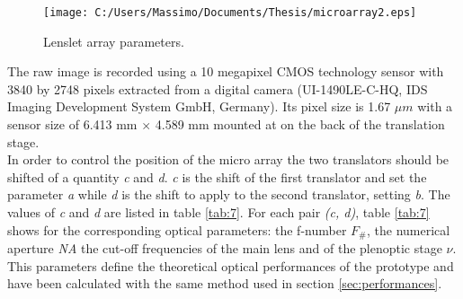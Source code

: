 \begin{figure}[H]
	\centering
	\texttt{[image: C:/Users/Massimo/Documents/Thesis/microarray2.eps]}
	\caption{\label{fig:micro array} Lenslet array parameters.}
\end{figure}
 The raw image is recorded using a 10 megapixel CMOS technology sensor with 3840 by 2748 pixels extracted from a digital camera (UI-1490LE-C-HQ, IDS Imaging Development System GmbH, Germany). Its pixel size is 1.67 $\mu m$ with a sensor size of 6.413 mm $\times$ 4.589 mm mounted at on the back of the translation stage. \\
 In order to control the position of the micro array the two translators should be shifted of a quantity \textit{c} and \textit{d}. \textit{c} is the shift of the first translator and set the parameter \textit{a} while \textit{d} is the shift to apply to the second translator, setting \textit{b}. The values of \textit{c} and \textit{d} are listed in table \ref{tab:7}.
 For each pair \textit{(c, d)}, table \ref{tab:7} shows for the corresponding optical parameters: the f-number $F_\#$, the numerical aperture \textit{NA} the cut-off frequencies of the main lens and of the plenoptic stage $\nu$. This parameters define the theoretical optical performances of the prototype and have been calculated with the same method used in section \ref{sec:performances}.
 \newpage
